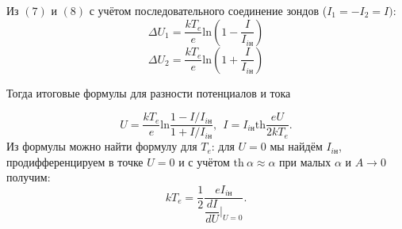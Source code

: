 Из $(7)$ и $(8)$ с учётом последовательного соединение зондов ($I_1 = -I_2 = I)$:
$$
\Delta U_1= \dfrac{kT_e}{e}\text{ln}\left(1 - \dfrac{I}{I_{i\text{н}}}\right)
$$
$$
\Delta U_2= \dfrac{kT_e}{e}\text{ln}\left(1 + \dfrac{I}{I_{i\text{н}}}\right)
$$

Тогда итоговые формулы для разности потенциалов и тока

\begin{equation}
    U = \dfrac{kT_e}{e}\text{ln}\dfrac{1 - I/I_{i\text{н}}}{1 + I/I_{i\text{н}}}, \ \
    I = I_{i\text{н}} \text{th}\dfrac{eU}{2kT_e}.
\end{equation}
Из формулы можно найти формулу для $T_e$: для $U=0$ мы найдём $I_{i\text{н}}$, продифференцируем в точке $U=0$ и с учётом $\text{th}~\alpha \approx \alpha$ при малых $\alpha$ и $A\rightarrow 0$ получим:
\begin{equation}
    kT_e = \dfrac{1}{2}\dfrac{eI_{i\text{н}}}{\dfrac{dI}{dU}|_{U=0}}.
\end{equation}

